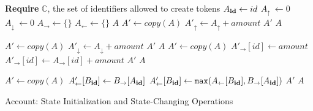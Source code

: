 \documentclass[9pt, oneside]{article}   	%
\begin{document}
\begin{algorithm}
\begin{algorithmic}[1]
   \State \textbf{Require} $\mathds{C}$, the set of identifiers allowed to create tokens
   \State
    	\State $A_{\scriptsize\textbf{id}} \leftarrow id$
	\State $A_\uparrow ~\leftarrow 0$       
	\State $A_\downarrow ~\leftarrow 0$   
	\State $A_\rightarrow \leftarrow \{ \}$ 
	\State $A_\leftarrow \leftarrow \{ \}$ 
    	\State \Return $A$
    \EndFunction
    \State
	      	 \State $A' \leftarrow \textit{copy}(A)$
		 \State $A'_\uparrow \leftarrow A_\uparrow + \textit{amount}$
		 \State \Return $A'$
	\Else
		\State \Return $A$
	\EndIf

    \EndFunction
    \State
    	 \label{ln:burn-balance-check}
		 \State $A' \leftarrow \textit{copy}(A)$
		 \State $A'_\downarrow \leftarrow A_\downarrow + \textit{amount}$
		 \State \Return $A'$
	\Else
		\State \Return $A$
	\EndIf
    \EndFunction
    \State
    	  \label{ln:give-balance-check}
	        \State $A' \leftarrow \textit{copy}(A)$
			\State $A'_{\rightarrow}[id] \leftarrow \textit{amount}$ 
		\Else
		         \State $A'_{\rightarrow}[id] \leftarrow A_{\rightarrow}[id] + \textit{amount}$ 
		\EndIf
		\State \Return $A'$
	\Else
		\State \Return $A$
	\EndIf

    \EndFunction
    \State
                \State $A' \leftarrow \textit{copy}(A)$
			 \State $A'_{\leftarrow}[B_{\scriptsize\textbf{id}}] \leftarrow B_{\rightarrow}[A_{\scriptsize\textbf{id}}]$
		\Else
			 \State $A'_{\leftarrow}[B_{\scriptsize\textbf{id}}] \leftarrow \texttt{max}(A_{\leftarrow}[B_{\scriptsize\textbf{id}}], B_{\rightarrow}[A_{\scriptsize\textbf{id}}])$ 
		\EndIf
		\State \Return $A'$
        \Else
        		\State \Return $A$
        \EndIf

    \EndFunction
    \end{algorithmic}
\caption{\label{alg:account} Account: State Initialization and State-Changing Operations}
\end{algorithm}
\end{document}

